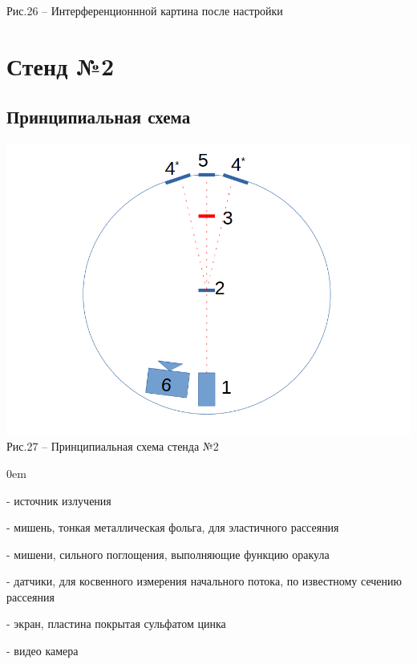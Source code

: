 \documentclass[11pt]{report}
\begin{document}
\begin{figure}[h]
\end{figure}

Рис.26 -- Интерференционнной картина после настройки \\

\section{Стенд №2}
\subsection{Принципиальная схема}

\includegraphics[scale=0.3]{ust_a}\\
Рис.27 -- Принципиальная схема стенда №2 \\

\begin{description}
\addtolength{\itemindent}{0.80cm}
\itemsep0em 
\item[1] - источник излучения
\item[2] - мишень, тонкая металлическая фольга, для эластичного рассеяния
\item[3] - мишени, сильного поглощения, выполняющие функцию оракула
\item[4] - датчики, для косвенного измерения начального потока, по известному сечению рассеяния
\item[5] - экран, пластина покрытая сульфатом цинка
\item[6] - видео камера
\end{description} 
\end{document}
